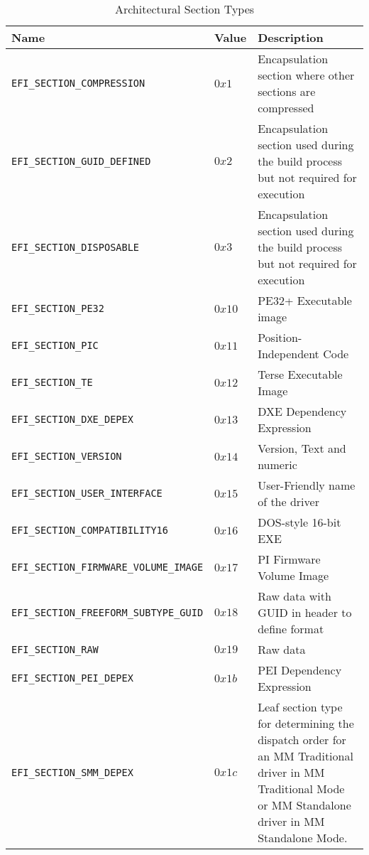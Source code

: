 \begin{table}[!htbp]
	\centering
	\renewcommand{\arraystretch}{1.2}
	\caption{Architectural Section Types}\label{table:architectural-section-types}
	\begin{tabular}{p{7cm} | l | p{5cm}}
		Name & Value & Description
		\\ \hline \hline
		\verb|EFI_SECTION_COMPRESSION| & $ 0x1 $ & Encapsulation section where other sections are compressed
		\\ \hline
		\verb|EFI_SECTION_GUID_DEFINED| & $ 0x2 $ & Encapsulation section used during the build process but not required for execution
		\\ \hline
		\verb|EFI_SECTION_DISPOSABLE| & $ 0x3 $ & Encapsulation section used during the build process but not required for execution
		\\ \hline
		\verb|EFI_SECTION_PE32| & $ 0x10 $ & PE32+ Executable image
		\\ \hline
		\verb|EFI_SECTION_PIC| & $ 0x11 $ & Position-Independent Code
		\\ \hline
		\verb|EFI_SECTION_TE| & $ 0x12 $ & Terse Executable Image
		\\ \hline
		\verb|EFI_SECTION_DXE_DEPEX| & $ 0x13 $ & DXE Dependency Expression
		\\ \hline
		\verb|EFI_SECTION_VERSION| & $ 0x14 $ & Version, Text and numeric
		\\ \hline
		\verb|EFI_SECTION_USER_INTERFACE| & $ 0x15 $ & User-Friendly name of the driver
		\\ \hline
		\verb|EFI_SECTION_COMPATIBILITY16| & $ 0x16 $ & DOS-style 16-bit EXE
		\\ \hline
		\verb|EFI_SECTION_FIRMWARE_VOLUME_IMAGE| & $ 0x17 $ & PI Firmware Volume Image
		\\ \hline
		\verb|EFI_SECTION_FREEFORM_SUBTYPE_GUID| & $ 0x18 $ & Raw data with GUID in header to define format
		\\ \hline
		\verb|EFI_SECTION_RAW| & $ 0x19 $ & Raw data
		\\ \hline
		\verb|EFI_SECTION_PEI_DEPEX| & $ 0x1b $ & PEI Dependency Expression
		\\ \hline
		\verb|EFI_SECTION_SMM_DEPEX| & $ 0x1c $ & Leaf section type for determining the dispatch order for an MM Traditional driver in MM Traditional Mode or MM Standalone driver in MM Standalone Mode.
		\\ \hline
	\end{tabular}
\end{table}

